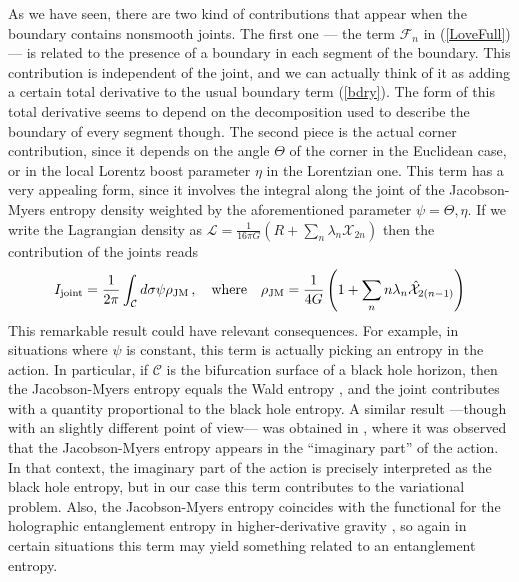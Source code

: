 \documentclass[11pt,letterpaper]{article}
\begin{document}
As we have seen, there are two kind of contributions that appear when the boundary contains nonsmooth joints. The first one --- the term $\mathcal{F}_n$ in (\ref{LoveFull}) --- is related to the presence of a boundary in each segment of the boundary. This contribution is independent of the joint, and we can actually think of it as adding a certain total derivative to the usual boundary term (\ref{bdry}).  The form of this total derivative seems to depend on the decomposition used to describe the boundary of every segment though. The second piece is the actual corner contribution, since it depends on the angle $\Theta$ of the corner in the Euclidean case, or in the local Lorentz boost parameter $\eta$ in the Lorentzian one.  This term has a very appealing form, since it involves the integral along the joint of the Jacobson-Myers entropy density \cite{Jacobson:1993xs} weighted by the aforementioned parameter $\psi=\Theta, \eta$. If we write the Lagrangian density as $\mathcal{L}=\frac{1}{16\pi G}\left(R+\sum_n\lambda_n \mathcal{X}_{2n}\right)$ then the contribution of the joints reads
\begin{equation}
I_{\rm joint}=\frac{1}{2\pi}\int_{\mathcal{C}}d\sigma \psi \rho_{\rm JM}\, ,\quad \text{where}\quad \rho_{\rm JM}=\frac{1}{4 G}\left(1+\sum_n n\lambda_n \hat{\mathcal{X}}_{2(n-1)}\right)
\end{equation} 
This remarkable result could have relevant consequences. For example, in situations where $\psi$ is constant, this term is actually picking an entropy in the action. In particular, if $\mathcal{C}$ is the bifurcation surface of a black hole horizon, then the Jacobson-Myers entropy equals the Wald entropy \cite{Wald:1993nt}, and the joint contributes with a quantity proportional to the black hole entropy. A similar result ---though with an slightly different point of view--- was obtained in \cite{Neiman:2013ap}, where it was observed that the Jacobson-Myers entropy appears in the ``imaginary part'' of the action. In that context, the imaginary part of the action is precisely interpreted as the black hole entropy, but in our case this term contributes to the variational problem. Also, the Jacobson-Myers entropy coincides with the  functional for the holographic entanglement entropy in higher-derivative gravity \cite{Camps:2013zua,Dong:2013qoa}, so again in certain situations this term may yield something related to an entanglement entropy. 
\end{document}
